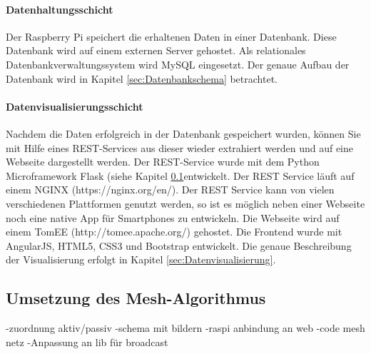 \paragraph{Datenhaltungsschicht} Der Raspberry Pi speichert die erhaltenen Daten in einer Datenbank. Diese Datenbank wird auf einem externen Server gehostet. Als relationales Datenbankverwaltungssystem wird MySQL eingesetzt. Der genaue Aufbau der Datenbank wird in Kapitel \ref{sec:Datenbankschema} betrachtet.
\paragraph{Datenvisualisierungsschicht} Nachdem die Daten erfolgreich in der Datenbank gespeichert wurden, können Sie mit Hilfe eines REST-Services aus dieser wieder extrahiert werden und auf eine Webseite dargestellt werden. Der REST-Service wurde mit dem Python Microframework Flask (siehe Kapitel \ref{}entwickelt. Der REST Service läuft auf einem NGINX (https://nginx.org/en/). Der REST Service kann von vielen verschiedenen Plattformen genutzt werden, so ist es möglich neben einer Webseite noch eine native App für Smartphones zu entwickeln. Die Webseite wird auf einem TomEE (http://tomee.apache.org/) gehostet. Die Frontend wurde mit AngularJS, HTML5, CSS3 und Bootstrap entwickelt. Die genaue Beschreibung der Visualisierung erfolgt in Kapitel \ref{sec:Datenvisualisierung}.
\subsection{Umsetzung des Mesh-Algorithmus}

-zuordnung aktiv/passiv
-schema mit bildern
-raspi anbindung an web
-code mesh netz
-Anpassung an lib für broadcast
